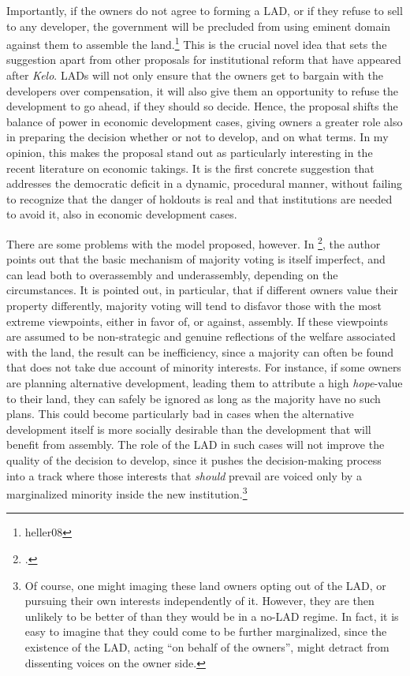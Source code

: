 Importantly, if the owners do not agree to forming a LAD, or if they refuse to sell to any developer, the government will be precluded from using eminent domain against them to assemble the land.\footnote[1491]{heller08} This is the crucial novel idea that sets the suggestion apart from other proposals for institutional reform that have appeared after {\it Kelo}. LADs will not only ensure that the owners get to bargain with the developers over compensation, it will also give them an opportunity to refuse the development to go ahead, if they should so decide. Hence, the proposal shifts the balance of power in economic development cases, giving owners a greater role also in preparing the decision whether or not to develop, and on what terms. In my opinion, this makes the proposal stand out as particularly interesting in the recent literature on economic takings. It is the first concrete suggestion that addresses the democratic deficit in a dynamic, procedural manner, without failing to recognize that the danger of holdouts is real and that institutions are needed to avoid it, also in economic development cases.

There are some problems with the model proposed, however. In \footcite{ladres09}, the author points out that the basic mechanism of majority voting is itself imperfect, and can lead both to overassembly and underassembly, depending on the circumstances. It is pointed out, in particular, that if different owners value their property differently, majority voting will tend to disfavor those with the most extreme viewpoints, either in favor of, or against, assembly. If these viewpoints are assumed to be non-strategic and genuine reflections of the welfare associated with the land, the result can be inefficiency, since a majority can often be found that does not take due account of minority interests. For instance, if some owners are planning alternative development, leading them to attribute a high {\it hope}-value to their land, they can safely be ignored as long as the majority have no such plans. This could become particularly bad in cases when the alternative development itself is more socially desirable than the development that will benefit from assembly. The role of the LAD in such cases will not improve the quality of the decision to develop, since it pushes the decision-making process into a track where those interests that {\it should} prevail are voiced only by a marginalized minority inside the new institution.\footnote{Of course, one might imaging these land owners opting out of the LAD, or pursuing their own interests independently of it. However, they are then unlikely to be better of than they would be in a no-LAD regime. In fact, it is easy to imagine that they could come to be further marginalized, since the existence of the LAD, acting ``on behalf of the owners'', might detract from dissenting voices on the owner side.}

